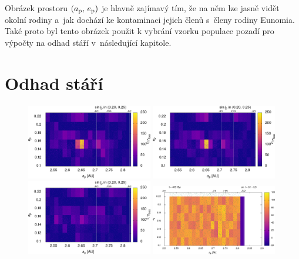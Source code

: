\documentclass[A4paper, 12pt, oneside]{book}
\begin{document}
Obrázek prostoru $(a_{\rm p},\,e_{\rm p})$ je hlavně zajímavý tím, že na něm lze jasně vidět okolní rodiny a~jak dochází ke kontaminaci jejich členů s~členy rodiny Eunomia. Také proto byl tento obrázek použit k vybrání vzorku populace pozadí pro výpočty na odhad stáří v~následující kapitole.

\section{Odhad stáří}

\immediate{}
\immediate{}
\immediate{}
\immediate{}
\begin{figure}
	\centering
	\includegraphics[width=0.49\textwidth]{obr/ae_chi_0006t.png}
	\includegraphics[width=0.49\textwidth]{obr/ae_chi_0106t.png}\\
	\includegraphics[width=0.49\textwidth]{obr/ae_chi_0406t.png}
	\includegraphics[width=0.49\textwidth]{obr/ae_chi_emptyt.png}

\end{figure}
\end{document}
